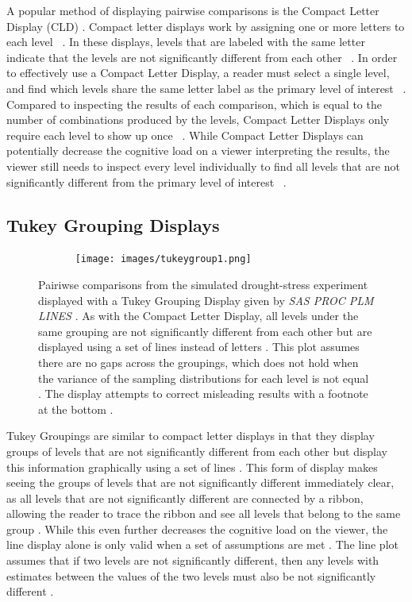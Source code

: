 \documentclass{article}
\begin{document}
A popular method of displaying pairwise comparisons is the Compact Letter Display (CLD) \cite{CLDVsLines, CLDInvest}. Compact letter displays work by assigning one or more letters to each level  \cite{CLDVsLines, CLDInvest}. In these displays, levels that are labeled with the same letter indicate that the levels are not significantly different from each other  \cite{CLDVsLines, CLDInvest}. In order to effectively use a Compact Letter Display, a reader must select a single level, and find which levels share the same letter label as the primary level of interest  \cite{CLDVsLines, CLDInvest}. Compared to inspecting the results of each comparison, which is equal to the number of combinations produced by the levels, Compact Letter Displays only require each level to show up once  \cite{CLDVsLines, CLDInvest}. While Compact Letter Displays can potentially decrease the cognitive load on a viewer interpreting the results, the viewer still needs to inspect every level individually to find all levels that are not significantly different from the primary level of interest  \cite{CLDVsLines, CLDInvest}.

\subsection{Tukey Grouping Displays}

\begin{figure}[H]
    \centering
    \texttt{[image: images/tukeygroup1.png]}
   \label{fig:compute}
    \caption{Pairiwse comparisons from the simulated drought-stress experiment displayed with a Tukey Grouping Display given by \emph{SAS PROC PLM LINES} \cite{procPLM}. As with the Compact Letter Display, all levels under the same grouping are not significantly different from each other but are displayed using a set of lines instead of letters \cite{CLDVsLines, CLDInvest, procPLM}. This plot assumes there are no gaps across the groupings, which does not hold when the variance of the sampling distributions for each level is not equal \cite{procPLM, dontUseBars, CLDVsLines}. The display attempts to correct misleading results with a footnote at the bottom \cite{procPLM}.}
\end{figure}

Tukey Groupings are similar to compact letter displays in that they display groups of levels that are not significantly different from each other but display this information graphically using a set of lines \cite{CLDInvest, CLDVsLines,dontUseBars,procPLM}. This form of display makes seeing the groups of levels that are not significantly different immediately clear, as all levels that are not significantly different are connected by a ribbon, allowing the reader to trace the ribbon and see all levels that belong to the same group \cite{CLDInvest, CLDVsLines,dontUseBars,procPLM}. While this even further decreases the cognitive load on the viewer, the line display alone is only valid when a set of assumptions are met \cite{CLDInvest, CLDVsLines,dontUseBars,procPLM}. The line plot assumes that if two levels are not significantly different, then any levels with estimates between the values of the two levels must also be not significantly different \cite{CLDInvest, CLDVsLines,dontUseBars,procPLM}.
\end{document}
